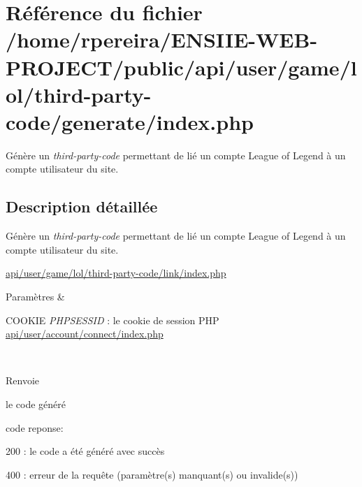 \hypertarget{user_2game_2lol_2third-party-code_2generate_2index_8php}{}\section{Référence du fichier /home/rpereira/\+E\+N\+S\+I\+I\+E-\/\+W\+E\+B-\/\+P\+R\+O\+J\+E\+C\+T/public/api/user/game/lol/third-\/party-\/code/generate/index.php}
\label{user_2game_2lol_2third-party-code_2generate_2index_8php}


Génère un {\itshape third-\/party-\/code} permettant de lié un compte League of Legend à un compte utilisateur du site.  




\subsection{Description détaillée}
Génère un {\itshape third-\/party-\/code} permettant de lié un compte League of Legend à un compte utilisateur du site. 

\hyperlink{user_2game_2lol_2third-party-code_2link_2index_8php}{api/user/game/lol/third-\/party-\/code/link/index.\+php} 
\begin{DoxyParams}{Paramètres}
{\em } & 
\begin{DoxyItemize}
\item C\+O\+O\+K\+IE {\itshape P\+H\+P\+S\+E\+S\+S\+ID} \+: le cookie de session P\+HP \hyperlink{user_2account_2connect_2index_8php}{api/user/account/connect/index.\+php} 
\end{DoxyItemize}\\
\hline
\end{DoxyParams}
\begin{DoxyReturn}{Renvoie}

\begin{DoxyItemize}
\item le code généré
\item code reponse\+:
\begin{DoxyItemize}
\item 200 \+: le code a été généré avec succès
\item 400 \+: erreur de la requête (paramètre(s) manquant(s) ou invalide(s)) 
\end{DoxyItemize}
\end{DoxyItemize}
\end{DoxyReturn}
